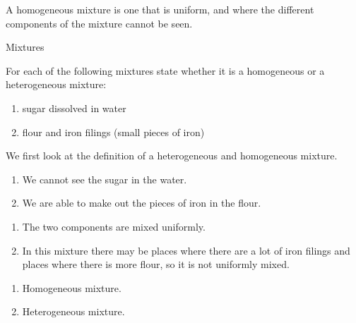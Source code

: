  {A homogeneous mixture is one that is uniform, and where the different components of the mixture cannot be seen. } 
\label{m38708*eip-479}
      \begin{wex}{Mixtures}
{For each of the following mixtures state whether it is a homogeneous or a heterogeneous mixture:
\label{m38708*eip-id1167649056231}\begin{enumerate}[noitemsep, label=\textbf{\alph*}. ] 
\item sugar dissolved in water
\item flour and iron filings (small pieces of iron)
\end{enumerate} }
{
We first look at the definition of a heterogeneous and homogeneous mixture.
\begin{enumerate}[noitemsep, label=\textbf{\alph*}. ] 
\item We cannot see the sugar in the water.
\item We are able to make out the pieces of iron in the flour.
 \end{enumerate}
\begin{enumerate}[noitemsep, label=\textbf{\alph*}. ] 
\item The two components are mixed uniformly.
\item In this mixture there may be places where there are a lot of iron filings and places where there is more flour, so it is not uniformly mixed.
\end{enumerate}
\begin{enumerate}[noitemsep, label=\textbf{\alph*}. ] 
\item Homogeneous mixture.
\item Heterogeneous mixture.\end{enumerate}}
    \end{wex}

